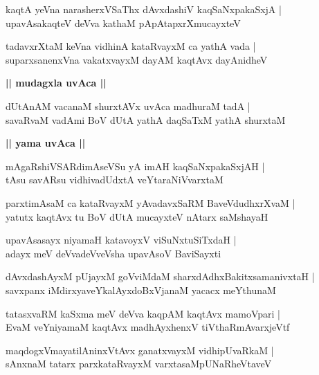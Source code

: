 \documentclass[twoside,12pt,openright]{book}
\newcounter{shloka}[chapter]
\def\uvaca#1{\centerline{{\large\textbf{#1}}}}
\begin{document}
\begin{shloka}%
kaqtA yeVna narasherxVSaThx dAvxdashiV kaqSaNxpakaSxjA |\\
upavAsakaqteV deVva kathaM pApAtapxrXmucayxteV
\end{shloka}

\begin{shloka}%
tadavxrXtaM keVna vidhinA kataRvayxM ca yathA vada |\\
suparxsanenxVna vakatxvayxM dayAM kaqtAvx dayAnidheV
\end{shloka}

\uvaca{|| mudagxla uvAca ||}

\begin{shloka}%
dUtAnAM vacanaM shurxtAVx uvAca madhuraM tadA |\\
savaRvaM vadAmi BoV dUtA yathA daqSaTxM yathA shurxtaM 
\end{shloka}

\uvaca{|| yama uvAca ||}

\begin{shloka}%
mAgaRshiVSARdimAseVSu yA imAH kaqSaNxpakaSxjAH |\\
tAsu savARsu vidhivadUdxtA veYtaraNiVvarxtaM 
\end{shloka}

\begin{shloka}%
parxtimAsaM ca kataRvayxM yAvadavxSaRM BaveVdudhxrXvaM |\\
yatutx kaqtAvx tu BoV dUtA mucayxteV nAtarx saMshayaH
\end{shloka}

\begin{shloka}%
upavAsasayx niyamaH katavoyxV viSuNxtuSiTxdaH |\\
adayx meV deVvadeVveVsha upavAsoV BaviSayxti
\end{shloka}

\begin{shloka}%
dAvxdashAyxM pUjayxM goVviMdaM sharxdAdhxBakitxsamanivxtaH |\\
savxpanx iMdirxyaveYkalAyxdoBxVjanaM yacacx meYthunaM 
\end{shloka}

\begin{shloka}%
tatasxvaRM kaSxma meV deVva kaqpAM kaqtAvx mamoVpari |\\
EvaM veYniyamaM kaqtAvx madhAyxhenxV tiVthaRmAvarxjeVtf 
\end{shloka}

\begin{shloka}%
maqdogxVmayatilAninxVtAvx ganatxvayxM vidhipUvaRkaM |\\
sAnxnaM tatarx parxkataRvayxM varxtasaMpUNaRheVtaveV 
\end{shloka}
\end{document}
